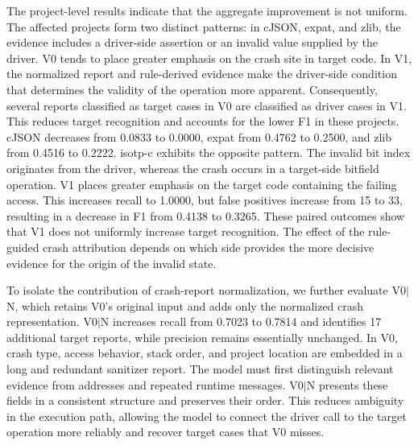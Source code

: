 \documentclass[pdflatex,sn-basic]{sn-jnl}%
\theoremstyle{thmstyleone}%
\theoremstyle{thmstyletwo}%
\theoremstyle{thmstylethree}%
\begin{document}
{\color{blue}
The project-level results indicate that the aggregate improvement is not uniform. The affected projects form two distinct patterns: in cJSON, expat, and zlib, the evidence includes a driver-side assertion or an invalid value supplied by the driver. V0 tends to place greater emphasis on the crash site in target code. In V1, the normalized report and rule-derived evidence make the driver-side condition that determines the validity of the operation more apparent. Consequently, several reports classified as target cases in V0 are classified as driver cases in V1. This reduces target recognition and accounts for the lower F1 in these projects. cJSON decreases from 0.0833 to 0.0000, expat from 0.4762 to 0.2500, and zlib from 0.4516 to 0.2222. isotp-c exhibits the opposite pattern. The invalid bit index originates from the driver, whereas the crash occurs in a target-side bitfield operation. V1 places greater emphasis on the target code containing the failing access. This increases recall to 1.0000, but false positives increase from 15 to 33, resulting in a decrease in F1 from 0.4138 to 0.3265. These paired outcomes show that V1 does not uniformly increase target recognition. The effect of the rule-guided crash attribution depends on which side provides the more decisive evidence for the origin of the invalid state.
}

{\color{blue}
To isolate the contribution of crash-report normalization, we further evaluate V0$\mid$N, which retains V0's original input and adds only the normalized crash representation. V0$\mid$N increases recall from 0.7023 to 0.7814 and identifies 17 additional target reports, while precision remains essentially unchanged. In V0, crash type, access behavior, stack order, and project location are embedded in a long and redundant sanitizer report. The model must first distinguish relevant evidence from addresses and repeated runtime messages. V0$\mid$N presents these fields in a consistent structure and preserves their order. This reduces ambiguity in the execution path, allowing the model to connect the driver call to the target operation more reliably and recover target cases that V0 misses.
}
\end{document}

